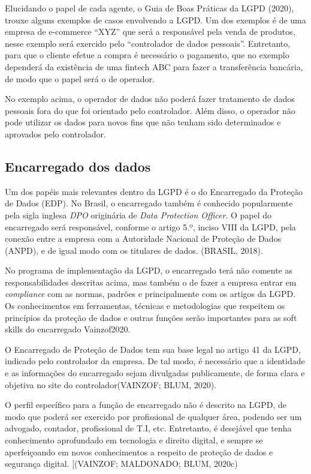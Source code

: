 \documentclass[
	12pt,				%
	openright,			%
	oneside,			%
	a4paper,			%
	english,			%
	french,				%
	spanish,			%
	brazil,				%
	]{abntex2}
\begin{document}
Elucidando o papel de cada agente, o Guia de Boas Práticas da LGPD (2020), trouxe alguns exemplos de casos envolvendo a LGPD. Um dos exemplos é de uma empresa de e-commerce “XYZ” que será a responsável pela venda de produtos, nesse exemplo será exercido pelo “controlador de dados pessoais”. Entretanto, para que o cliente efetue a compra é necessário o pagamento, que no exemplo dependerá da existência de uma fintech ABC para fazer a transferência bancária, de modo que o papel será o de operador.

No exemplo acima, o operador de dados não poderá fazer tratamento de dados pessoais fora do que foi orientado pelo controlador. Além disso, o operador não pode utilizar os dados para novos fins que não tenham sido determinados e aprovados pelo controlador.

\subsection{Encarregado dos dados}

Um dos papéis mais relevantes dentro da LGPD é o do Encarregado da Proteção de Dados (EDP). No Brasil, o encarregado também é conhecido popularmente pela sigla inglesa \textit{DPO} originária de \textit{Data Protection Officer}. O papel do encarregado será responsável, conforme o artigo 5.º, inciso VIII da LGPD, pela conexão entre a empresa com a Autoridade Nacional de Proteção de Dados (ANPD), e de igual modo com os titulares de dados. (BRASIL, 2018). 

No programa de implementação da LGPD, o encarregado terá não comente as responsabilidades descritas acima, mas também o de fazer a empresa entrar em \textit{compliance} com as normas, padrões e principalmente com os artigos da LGPD. Os conhecimentos em ferramentas, técnicas e metodologias que respeitem os princípios da proteção de dados e outras funções serão importantes para as soft skills do encarregado Vainzof2020.

O Encarregado de Proteção de Dados tem sua base legal no artigo 41 da LGPD, indicado pelo controlador da empresa. De tal modo, é necessário que a identidade e as informações do encarregado sejam divulgadas publicamente, de forma clara e objetiva no site do controlador(VAINZOF; BLUM, 2020).

O perfil específico para a função de encarregado não é descrito na LGPD, de modo que poderá ser exercido por profissional de qualquer área, podendo ser um advogado, contador, profissional de T.I, etc. Entretanto, é desejável que tenha conhecimento aprofundado em tecnologia e direito digital, e sempre se aperfeiçoando em novos conhecimentos a respeito de proteção de dados e segurança digital. [(VAINZOF; MALDONADO; BLUM, 2020c)
\end{document}

